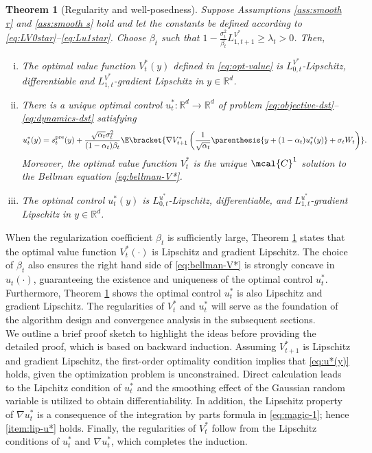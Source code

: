 \documentclass{article}
\newtheorem{Theorem}{Theorem}[section]
\newcommand{\R}{\mathbb{R}}
\begin{document}
\begin{Theorem}[Regularity and well-posedness]\label{thm:well-posed}
Suppose Assumptions \ref{ass:smooth r} and \ref{ass:smooth s} hold and let the constants be defined according to \eqref{eq:LV0star}--\eqref{eq:Lu1star}. Choose $\beta_t$ such that $ 1 - \frac{\sigma_t^2}{\beta_t}L_{1, t+1}^{V^*} \geq \lambda_{t} > 0  $. Then,
\begin{enumerate}[(i)]
\item The optimal value function $V_t^*(y)$ defined in \eqref{eq:opt-value} is $L_{0,t}^{V^{*}}$-Lipschitz, differentiable and $L_{1,t}^{V^{*}}$-gradient Lipschitz in $y \in \R^d$.

    \item There is a unique optimal control $u_t^*: \R^d \to \R^d$ of problem \eqref{eq:objective-dst}--\eqref{eq:dynamics-dst} satisfying
\begin{eqnarray}\label{eq:u*(y)}
     u_{t}^{*}(y)  = s_{t}^{\rm pre}(y) + \frac{\sqrt{\alpha_{t}}\sigma_{t}^{2}}{(1 - \alpha_{t})\beta_t}\E\bracket{\nabla V_{t+1}^{*}\left(\frac{1}{\sqrt{\alpha_t}}\parenthesis{y + (1 - \alpha_t)u_t^*(y)} + \sigma_t W_t\right)}.
\end{eqnarray}
Moreover, the optimal value function $V_t^*$ is the unique $\mcal{C}^1$ solution to the Bellman equation \eqref{eq:bellman-V*}. 
\item \label{item:lip-u*} The optimal control $u_t^*(y)$ is $L_{0, t}^{u^{*}}$-Lipschitz, differentiable, and $ L_{1,t}^{u^{*}} $-gradient Lipschitz in $y \in \R^d$.

\end{enumerate}
\end{Theorem}

When the regularization coefficient $\beta_t$ is sufficiently large, Theorem \ref{thm:well-posed} states that the optimal value function $V_t^*(\cdot)$ is Lipschitz and gradient Lipschitz. The choice of $\beta_t$ also ensures the right hand side of \eqref{eq:bellman-V*} is strongly concave in $u_t(\cdot)$, guaranteeing the existence and uniqueness of the optimal control $u_t^*$. Furthermore, Theorem \ref{thm:well-posed} shows the optimal control $u_t^*$ is also Lipschitz and gradient Lipschitz. The regularities of $V_t^*$ and $u_t^*$ will serve as the foundation of the algorithm design and convergence analysis in the subsequent sections. \\

{We outline a brief proof sketch to highlight the ideas before providing the detailed proof, which is based on backward induction. Assuming $V_{t+1}^*$ is Lipschitz and gradient Lipschitz, the first-order optimality condition  implies that \eqref{eq:u*(y)} holds, given the  optimization problem is unconstrained. Direct calculation leads to the Lipchitz condition of $u_t^*$ and the smoothing effect of the Gaussian random variable is utilized to obtain differentiability. In addition, the Lipschitz property of $\nabla u_t^*$ is a consequence of the integration by parts formula in \eqref{eq:magic-1}; hence \eqref{item:lip-u*} holds. Finally, the regularities of $V_t^*$ follow from the Lipschitz conditions of $u_t^*$ and $\nabla u_t^*$, which completes the induction.}
\end{document}
